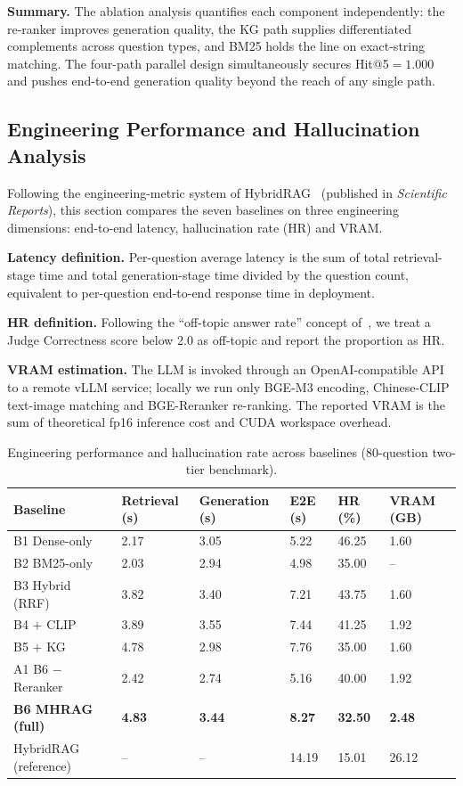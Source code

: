 \documentclass[applsci,article,submit,pdftex,moreauthors]{Definitions/mdpi}
\begin{document}
\textbf{Summary.} The ablation analysis quantifies each component independently: the re-ranker improves generation quality, the KG path supplies differentiated complements across question types, and BM25 holds the line on exact-string matching. The four-path parallel design simultaneously secures Hit@5${=}1.000$ and pushes end-to-end generation quality beyond the reach of any single path.

\subsection{Engineering Performance and Hallucination Analysis}
\label{sec:exp-engineering}

Following the engineering-metric system of HybridRAG~\citep{shen2025hybridrag} (published in \textit{Scientific Reports}), this section compares the seven baselines on three engineering dimensions: end-to-end latency, hallucination rate (HR) and VRAM.

\textbf{Latency definition.} Per-question average latency is the sum of total retrieval-stage time and total generation-stage time divided by the question count, equivalent to per-question end-to-end response time in deployment.

\textbf{HR definition.} Following the ``off-topic answer rate'' concept of~\citep{shen2025hybridrag}, we treat a Judge Correctness score below 2.0 as off-topic and report the proportion as HR.

\textbf{VRAM estimation.} The LLM is invoked through an OpenAI-compatible API to a remote vLLM service; locally we run only BGE-M3 encoding, Chinese-CLIP text-image matching and BGE-Reranker re-ranking. The reported VRAM is the sum of theoretical fp16 inference cost and CUDA workspace overhead.

\begin{table}[H]
\caption{Engineering performance and hallucination rate across baselines (80-question two-tier benchmark).\label{tab:exp-engineering}}
\begin{tabularx}{\textwidth}{lYYYYY}
\toprule
Baseline & Retrieval (s) & Generation (s) & E2E (s) & HR (\%) & VRAM (GB)\\
\midrule
B1 Dense-only      & 2.17 & 3.05 & 5.22 & 46.25 & 1.60\\
B2 BM25-only       & 2.03 & 2.94 & 4.98 & 35.00 & --  \\
B3 Hybrid (RRF)    & 3.82 & 3.40 & 7.21 & 43.75 & 1.60\\
B4 $+$ CLIP        & 3.89 & 3.55 & 7.44 & 41.25 & 1.92\\
B5 $+$ KG          & 4.78 & 2.98 & 7.76 & 35.00 & 1.60\\
A1 B6 $-$ Reranker & 2.42 & 2.74 & 5.16 & 40.00 & 1.92\\
\textbf{B6 MHRAG (full)} & \textbf{4.83} & \textbf{3.44} & \textbf{8.27} & \textbf{32.50} & \textbf{2.48}\\
\midrule
HybridRAG~\citep{shen2025hybridrag} (reference) & -- & -- & 14.19 & 15.01 & 26.12\\
\bottomrule
\end{tabularx}
\end{table}
\end{document}
